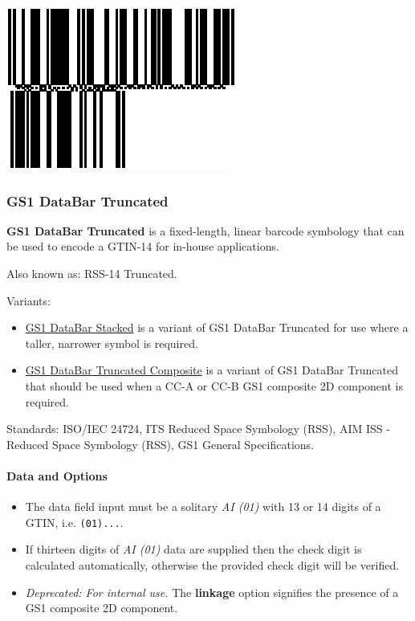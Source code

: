 \includegraphics{images/databarexpandedstacked-1.eps}

\hypertarget{gs1-databar-truncated}{%
\subsubsection{GS1 DataBar Truncated}\label{gs1-databar-truncated}}

\textbf{GS1 DataBar Truncated} is a fixed-length, linear barcode
symbology that can be used to encode a GTIN-14 for in-house
applications.

Also known as: RSS-14 Truncated.

Variants:

\begin{itemize}
\tightlist
\item
  \protect\hyperlink{gs1-databar-stacked}{GS1 DataBar Stacked} is a
  variant of GS1 DataBar Truncated for use where a taller, narrower
  symbol is required.
\item
  \protect\hyperlink{gs1-composite-symbols}{GS1 DataBar Truncated
  Composite} is a variant of GS1 DataBar Truncated that should be used
  when a CC-A or CC-B GS1 composite 2D component is required.
\end{itemize}

Standards: ISO/IEC 24724, ITS Reduced Space Symbology (RSS), AIM ISS -
Reduced Space Symbology (RSS), GS1 General Specifications.

\hypertarget{data-and-options-38}{%
\paragraph{Data and Options}\label{data-and-options-38}}

\begin{itemize}
\tightlist
\item
  The data field input must be a solitary \emph{AI (01)} with 13 or 14
  digits of a GTIN, i.e. \texttt{(01)...}.
\item
  If thirteen digits of \emph{AI (01)} data are supplied then the check
  digit is calculated automatically, otherwise the provided check digit
  will be verified.
\item
  \emph{Deprecated: For internal use.} The \textbf{linkage} option
  signifies the presence of a GS1 composite 2D component.
\end{itemize}

